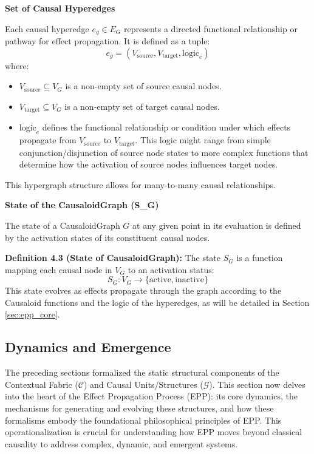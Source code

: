 \textbf{Set of Causal Hyperedges}
        
        
        Each causal hyperedge \( e_g \in E_G \) represents a directed functional relationship or pathway for effect propagation. It is defined as a tuple:
        \[ e_g = (V_{\text{source}}, V_{\text{target}}, \text{logic}_e) \]
        where:
        \begin{itemize}
            \item \( V_{\text{source}} \subseteq V_G \) is a non-empty set of source causal nodes.
            \item \( V_{\text{target}} \subseteq V_G \) is a non-empty set of target causal nodes.
            \item \( \text{logic}_e \) defines the functional relationship or condition under which effects propagate from \(V_{\text{source}}\) to \(V_{\text{target}}\). This logic might range from simple conjunction/disjunction of source node states to more complex functions that determine how the activation of source nodes influences target nodes.
        \end{itemize}
        This hypergraph structure allows for many-to-many causal relationships.

        
\textbf{State of the CausaloidGraph (S\_G)}
        
        The state of a CausaloidGraph \( G \) at any given point in its evaluation is defined by the activation states of its constituent causal nodes. 
        
        \textbf{Definition 4.3 (State of CausaloidGraph):} The state \( S_G \) is a function mapping each causal node in \(V_G\) to an activation status:
        \[ S_G: V_G \to \{\text{active}, \text{inactive}\} \]
        This state evolves as effects propagate through the graph according to the Causaloid functions and the logic of the hyperedges, as will be detailed in Section \ref{sec:epp_core}.



\subsection[Effect Propagation, Dynamics, and Emergence]{Dynamics and Emergence}
\label{sec:formalization_epp}

The preceding sections formalized the static structural components of the Contextual Fabric (\(\mathcal{C}\)) and Causal Units/Structures (\(\mathcal{G}\)). This section now delves into the heart of the Effect Propagation Process (EPP): its core dynamics, the mechanisms for generating and evolving these structures, and how these formalisms embody the foundational philosophical principles of EPP. This operationalization is crucial for understanding how EPP moves beyond classical causality to address complex, dynamic, and emergent systems.

